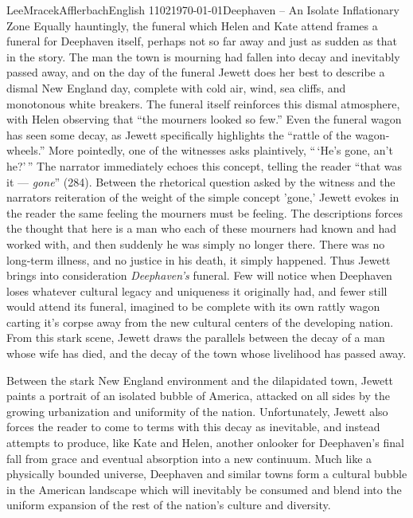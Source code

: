 \documentclass[12pt, letterpaper]{article}
\begin{document}
\begin{mla}{Lee}{Mracek}{Afflerbach}{English
1102}{\today}{Deephaven -- An Isolate Inflationary Zone}
Equally hauntingly, the funeral which Helen and Kate attend frames a funeral for
Deephaven itself, perhaps not so far away and just as sudden as that in the
story. The man the town is mourning had fallen into decay and inevitably passed
away, and on the day of the funeral Jewett does her best to describe a dismal
New England day, complete with cold air, wind, sea cliffs, and monotonous white
breakers. The funeral itself reinforces this dismal atmosphere, with Helen
observing that ``the mourners looked so few.'' Even the funeral wagon has seen
some decay, as Jewett specifically highlights the ``rattle of the
wagon-wheels.'' More pointedly, one of the witnesses asks plaintively, ``\,`He's
gone, an't he?'\,'' The narrator immediately echoes this concept, telling the
reader ``that was it --- \textit{gone}'' (284). Between the rhetorical question
asked by the witness and the narrators reiteration of the weight of the simple
concept 'gone,' Jewett evokes in the reader the same feeling the mourners must
be feeling. The descriptions forces the thought that here is a man who each of
these mourners had known and had worked with, and then suddenly he was simply no
longer there. There was no long-term illness, and no justice in his death, it
simply happened. Thus Jewett brings into consideration \textit{Deephaven's}
funeral. Few will notice when Deephaven loses whatever cultural legacy and
uniqueness it originally had, and fewer still would attend its funeral, imagined
to be complete with its own rattly wagon carting it's corpse away from the new
cultural centers of the developing nation. From this stark scene, Jewett draws
the parallels between the decay of a man whose wife has died, and the decay of
the town whose livelihood has passed away.

Between the stark New England environment and the dilapidated town, Jewett
paints a portrait of an isolated bubble of America, attacked on all sides by the
growing urbanization and uniformity of the nation. Unfortunately, Jewett also
forces the reader to come to terms with this decay as inevitable, and instead
attempts to produce, like Kate and Helen, another onlooker for Deephaven's final
fall from grace and eventual absorption into a new continuum. Much like a
physically bounded universe, Deephaven and similar towns form a cultural bubble
in the American landscape which will inevitably be consumed and blend into the
uniform expansion of the rest of the nation's culture and diversity.
\end{mla}
\end{document}
